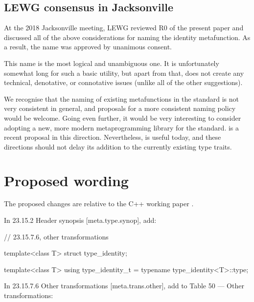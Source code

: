 \subsection{LEWG consensus in Jacksonville}

At the 2018 Jacksonville meeting, LEWG reviewed R0 of the present paper and discussed all of the above considerations for naming the identity metafunction. As a result, the name  was approved by unanimous consent. 

This name is the most logical and unambiguous one. It is unfortunately somewhat long for such a basic utility, but apart from that,  does not create any technical, denotative, or connotative issues (unlike all of the other suggestions).

We recognise that the naming of existing metafunctions in the standard is not very consistent in general, and proposals for a more consistent naming policy would be welcome. Going even further, it would be very interesting to consider adopting a new, more modern metaprogramming library for the standard. \cite{P0949} is a recent proposal in this direction. Nevertheless,  is useful today, and these directions should not delay its addition to the currently existing type traits.


\section{Proposed wording}

The proposed changes are relative to the C++ working paper \cite{Smith2018}.

In 23.15.2 Header  synopsis [meta.type.synop], add:

\begin{codeblock}
// 23.15.7.6, other transformations
\end{codeblock}
\begin{addedblock}
\begin{codeblock}
template<class T> struct type_identity;

template<class T>
  using type_identity_t = typename type_identity<T>::type;
\end{codeblock}
\end{addedblock}


In 23.15.7.6 Other transformations [meta.trans.other], add to Table 50 --- Other transformations:

